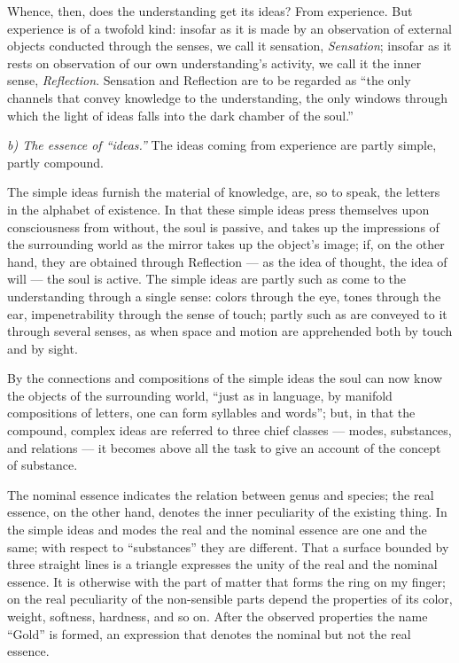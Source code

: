 \documentclass[12pt]{book}
\begin{document}
Whence, then, does the understanding get its ideas? From experience. But
experience is of a twofold kind: insofar as it is made by an observation of
external objects conducted through the senses, we call it sensation,
\emph{Sensation}; insofar as it rests on observation of our own understanding's
activity, we call it the inner sense, \emph{Reflection}. Sensation and Reflection
are to be regarded as ``the only channels that convey knowledge to the
understanding, the only windows through which the light of ideas falls into the
dark chamber of the soul.''

\emph{b) The essence of ``ideas.''} The ideas coming from experience are partly
simple, partly compound.

The simple ideas furnish the material of knowledge, are, so to speak, the letters
in the alphabet of existence. In that these simple ideas press themselves upon
consciousness from without, the soul is passive, and takes up the impressions of
the surrounding world as the mirror takes up
the object's image; if, on the other hand, they are obtained through Reflection
--- as the idea of thought, the idea of will --- the soul is active. The simple
ideas are partly such as come to the understanding through a single sense: colors
through the eye, tones through the ear, impenetrability through the sense of
touch; partly such as are conveyed to it through several senses, as when space
and motion are apprehended both by touch and by sight.

By the connections and compositions of the simple ideas the soul can now know the
objects of the surrounding world, ``just as in language, by manifold compositions
of letters, one can form syllables and words''; but, in that the compound,
complex ideas are referred to three chief classes --- modes, substances, and
relations --- it becomes above all the task to give an account of the concept of
substance.

The nominal essence indicates the relation between genus and species; the real
essence, on the other hand, denotes the inner
peculiarity of the existing thing. In the simple ideas and modes the real and the
nominal essence are one and the same; with respect to ``substances'' they are
different. That a surface bounded by three straight lines is a triangle expresses
the unity of the real and the nominal essence. It is otherwise with the part of
matter that forms the ring on my finger; on the real peculiarity of the
non-sensible parts depend the properties of its color, weight, softness,
hardness, and so on. After the observed properties the name ``Gold'' is formed,
an expression that denotes the nominal but not the real essence.
\end{document}
